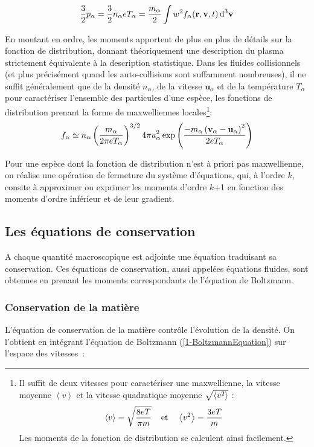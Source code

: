 \begin{refsection}
\begin{equation}
\frac{3}{2}p_\alpha=\frac{3}{2}n_\alpha eT_\alpha=\frac{m_\alpha}{2}\int 
w^{{2}} f_\alpha(\mathbf r,\mathbf v,t) \,\text{d}^{{3}}\mathbf{v}
\end{equation}

En montant en ordre, les moments apportent de plus en plus de détails sur la
fonction de distribution, donnant théoriquement une description du plasma
strictement équivalente à la description statistique. Dans les fluides
collisionnels (et plus précisément quand les auto-collisions sont suffamment
nombreuses), il ne suffit généralement que de la densité $n_\alpha$, de la
vitesse $\mathbf{u}_\alpha$ et de la température $T_\alpha$ pour caractériser l'ensemble des particules d'une espèce, les fonctions de distribution
prenant la forme de maxwelliennes locales\footnote{Il suffit de deux vitesses
pour caractériser une maxwellienne, la vitesse moyenne $\left<v\right>$ et la vitesse quadratique moyenne $\sqrt{\left<v^{{2}}\right>}$ :
$$
	\left<v\right>=\sqrt{\frac{8eT}{\pi m}} \;\;\;\;\text{et}\;\;\;\; 
	\left<v^{{2}}\right>=\frac{3eT}{m}
$$ 
Les moments de la fonction de distribution se calculent ainsi facilement.}:
\begin{equation}
\label{1-MaxwellDistribution}
	f_\alpha\simeq n_\alpha
	\left(\frac{m_\alpha}{2\pi
	eT_\alpha}\right)^{{3/2}}4\pi
	u_\alpha^{{2}}\exp\left(\frac{-m_\alpha \left(\mathbf
	v_\alpha-\mathbf u_\alpha\right)^{{2}}}{2eT_\alpha}\right)
\end{equation}

Pour une espèce dont la fonction de distribution n'est à priori pas
maxwellienne, on réalise une opération de fermeture du système d'équations, qui,
à l'ordre $k$, consite à approximer ou exprimer les moments d'ordre $k$+1
en fonction des moments d'ordre inférieur et de leur gradient.

\subsection{Les équations de conservation}

A chaque quantité macroscopique est adjointe une équation traduisant sa
conservation. Ces équations de conservation, aussi appelées équations fluides,
sont obtenues en prenant les moments correspondants de l'équation de Boltzmann.

\subsubsection{Conservation de la matière}
L'équation de conservation de la matière contrôle
l'évolution de la densité. On l'obtient en intégrant
l'équation de Boltzmann (\eqref{1-BoltzmannEquation}) sur l'espace des
vitesses~:


\end{refsection}
